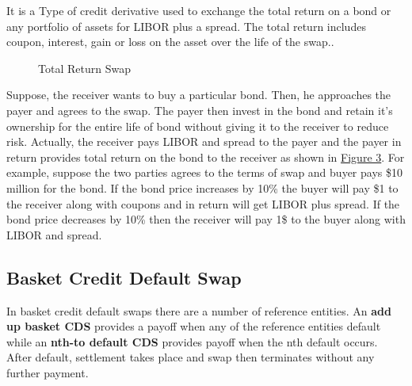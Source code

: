 \documentclass[11pt]{article}
\numberwithin{equation}{section}
\begin{document}
	   It is a Type of credit derivative used to exchange the total return on a bond or any portfolio of assets for LIBOR plus a spread. The total return includes coupon, interest, gain or loss on the asset over the life of the swap..   
\begin{figure}[H]
		\centering
		\caption{Total Return Swap}
		\label{f3_a}
\end{figure}
\pagebreak
 \hspace{1cm}Suppose, the receiver wants to buy a particular bond. Then, he approaches the payer and agrees to the swap. The payer then invest in the bond and retain it's ownership for the entire life of bond without giving it to the receiver to reduce risk. Actually, the receiver pays LIBOR and spread to the payer 
and the payer in return provides total return on the bond to the receiver as shown in \hyperref[f3_a]{Figure 3}. For example, suppose the two parties agrees to the terms of swap and buyer pays \$10 million for the bond. If the bond price increases by 10\% the buyer will pay \$1 to the receiver along with coupons and in return will get LIBOR plus spread. If the bond price decreases by 10\% then the receiver will pay 1\$ to the buyer along with LIBOR and spread.

 \subsection{Basket Credit Default Swap}
  \medskip
	   
In basket credit default swaps there are a number of reference entities. An \textbf{add up basket CDS} provides a payoff when any of the reference entities default while an \textbf{nth-to default CDS} provides payoff when the nth default occurs. After default, settlement takes place and swap then terminates without any further payment.
\end{document}

